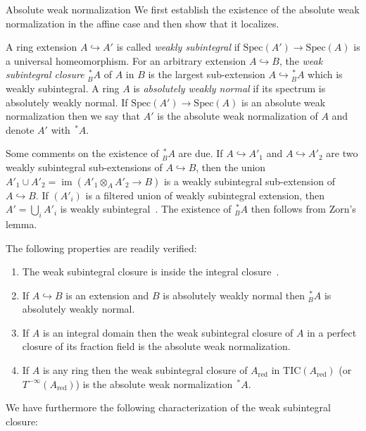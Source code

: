 \documentclass[a4paper,twoside,11pt]{amsart}[2009/07/02] %
\newcommand{\inj}{\hookrightarrow}
\DeclareMathOperator{\image}{im}
\newcommand{\Spec}{\mathrm{Spec}}
\newcommand{\red}{\mathrm{red}}
\newcommand{\rwn}[2]{{^{\,*}_{#1}#2}} %
\newcommand{\TIC}{\mathrm{TIC}}
\begin{document}
\begin{section}{Absolute weak normalization}
We first establish the existence of the absolute weak normalization in the
affine case and then show that it localizes.

\begin{definition}
A ring extension $A\inj A'$ is called \emph{weakly subintegral} if
$\Spec(A')\to\Spec(A)$ is a universal homeomorphism. For an arbitrary extension
$A\inj B$, the \emph{weak subintegral closure} $\rwn{B}{A}$ of $A$ in $B$ is
the largest sub-extension $A\inj \rwn{B}{A}$ which is weakly subintegral. 
%
A ring $A$ is \emph{absolutely weakly normal} if its spectrum is absolutely
weakly normal. If $\Spec(A')\to\Spec(A)$ is an absolute weak normalization then
we say that $A'$ is the absolute weak normalization of $A$ and denote $A'$ with
$\rwn{}{A}$.
\end{definition}

Some comments on the existence of $\rwn{B}{A}$ are due. If $A\inj A'_1$ and
$A\inj A'_2$ are two weakly subintegral sub-extensions of $A\inj B$, then the
union $A'_1\cup A'_2=\image(A'_1\otimes_A A'_2\to B)$ is a weakly subintegral
sub-extension of $A\inj B$. If $(A'_i)$ is a filtered union of weakly
subintegral extension, then $A'=\bigcup_i A'_i$ is weakly
subintegral~\cite[Cor.~8.2.10]{egaIV}. The existence of $\rwn{B}{A}$ then
follows from Zorn's lemma.

\begin{properties}
The following properties are readily verified:
\begin{enumerate}
\item The weak subintegral closure is inside the integral
closure~\cite[Cor.~18.12.11]{egaIV}.
\item If $A\inj B$ is an extension and $B$ is absolutely weakly normal then
$\rwn{B}{A}$ is absolutely weakly normal.
\item If $A$ is an integral domain then the weak subintegral closure of $A$
in a perfect closure of its fraction field is the absolute weak normalization.
\item If $A$ is any ring then the weak subintegral closure of $A_\red$
in $\TIC(A_\red)$ (or $T^{-\infty}(A_\red)$) is the absolute weak normalization
$\rwn{}{A}$.
\end{enumerate}
\end{properties}

We have furthermore the following characterization of the weak subintegral
closure:


\end{section}
\end{document}
